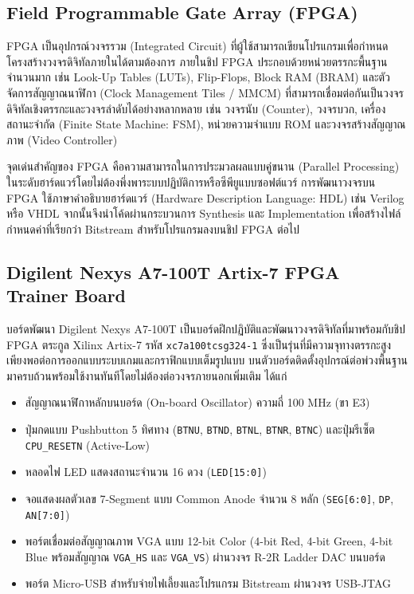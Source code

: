\subsection{Field Programmable Gate Array (FPGA)}

FPGA เป็นอุปกรณ์วงจรรวม (Integrated Circuit) ที่ผู้ใช้สามารถเขียนโปรแกรมเพื่อกำหนดโครงสร้างวงจรดิจิทัลภายในได้ตามต้องการ ภายในชิป FPGA ประกอบด้วยหน่วยตรรกะพื้นฐานจำนวนมาก เช่น Look-Up Tables (LUTs), Flip-Flops, Block RAM (BRAM) และตัวจัดการสัญญาณนาฬิกา (Clock Management Tiles / MMCM) ที่สามารถเชื่อมต่อกันเป็นวงจรดิจิทัลเชิงตรรกะและวงจรลำดับได้อย่างหลากหลาย เช่น วงจรนับ (Counter), วงจรบวก, เครื่องสถานะจำกัด (Finite State Machine: FSM), หน่วยความจำแบบ ROM และวงจรสร้างสัญญาณภาพ (Video Controller)

จุดเด่นสำคัญของ FPGA คือความสามารถในการประมวลผลแบบคู่ขนาน (Parallel Processing) ในระดับฮาร์ดแวร์โดยไม่ต้องพึ่งพาระบบปฏิบัติการหรือซีพียูแบบซอฟต์แวร์ การพัฒนาวงจรบน FPGA ใช้ภาษาคำอธิบายฮาร์ดแวร์ (Hardware Description Language: HDL) เช่น Verilog หรือ VHDL จากนั้นจึงนำโค้ดผ่านกระบวนการ Synthesis และ Implementation เพื่อสร้างไฟล์กำหนดค่าที่เรียกว่า Bitstream สำหรับโปรแกรมลงบนชิป FPGA ต่อไป

\subsection{Digilent Nexys A7-100T Artix-7 FPGA Trainer Board}

บอร์ดพัฒนา Digilent Nexys A7-100T เป็นบอร์ดฝึกปฏิบัติและพัฒนาวงจรดิจิทัลที่มาพร้อมกับชิป FPGA ตระกูล Xilinx Artix-7 รหัส \texttt{xc7a100tcsg324-1} ซึ่งเป็นรุ่นที่มีความจุทางตรรกะสูงเพียงพอต่อการออกแบบระบบเกมและกราฟิกแบบเต็มรูปแบบ บนตัวบอร์ดติดตั้งอุปกรณ์ต่อพ่วงพื้นฐานมาครบถ้วนพร้อมใช้งานทันทีโดยไม่ต้องต่อวงจรภายนอกเพิ่มเติม ได้แก่

\begin{itemize}[leftmargin=1.5cm]
    \item สัญญาณนาฬิกาหลักบนบอร์ด (On-board Oscillator) ความถี่ 100 MHz (ขา E3)
    \item ปุ่มกดแบบ Pushbutton 5 ทิศทาง (\texttt{BTNU}, \texttt{BTND}, \texttt{BTNL}, \texttt{BTNR}, \texttt{BTNC}) และปุ่มรีเซ็ต \texttt{CPU\_RESETN} (Active-Low)
    \item หลอดไฟ LED แสดงสถานะจำนวน 16 ดวง (\texttt{LED[15:0]})
    \item จอแสดงผลตัวเลข 7-Segment แบบ Common Anode จำนวน 8 หลัก (\texttt{SEG[6:0]}, \texttt{DP}, \texttt{AN[7:0]})
    \item พอร์ตเชื่อมต่อสัญญาณภาพ VGA แบบ 12-bit Color (4-bit Red, 4-bit Green, 4-bit Blue พร้อมสัญญาณ \texttt{VGA\_HS} และ \texttt{VGA\_VS}) ผ่านวงจร R-2R Ladder DAC บนบอร์ด
    \item พอร์ต Micro-USB สำหรับจ่ายไฟเลี้ยงและโปรแกรม Bitstream ผ่านวงจร USB-JTAG
\end{itemize}
